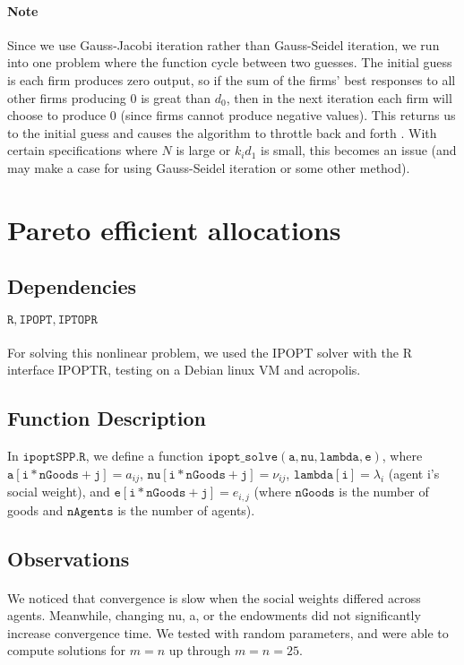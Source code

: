 \documentclass[11pt]{article}
\begin{document}
\paragraph{Note} Since we use Gauss-Jacobi iteration rather than Gauss-Seidel iteration, we run into one problem where the function cycle between two guesses. 
The initial guess is each firm produces zero output, so if the sum of the firms' best responses to all other firms producing 0 is great than $d_0$, then in the next iteration each firm will choose to produce 0 (since firms cannot produce negative values).
This returns us to the initial guess and causes the algorithm to throttle back and forth  . With certain specifications where $N$ is large or $k_i d_1$ is small, this becomes an issue (and may make a case for using Gauss-Seidel iteration or some other method).

\clearpage
\section{Pareto efficient allocations}
\subsection*{Dependencies} $\mathtt{R, IPOPT, IPTOPR}$
\paragraph{} For solving this nonlinear problem, we used the IPOPT solver with the R interface IPOPTR, testing on a Debian linux VM and acropolis.

\subsection*{Function Description}
In $\mathtt{ipoptSPP.R}$, we define a function $\mathtt{ipopt\_solve(a,nu,lambda,e)}$, where $\mathtt{a[i*nGoods + j]}= a_{ij}$, $\mathtt{nu[i*nGoods + j]}= \nu_{ij}$, $\mathtt{lambda[i]}=\lambda_i$ (agent i's social weight), and $\mathtt{e[i*nGoods + j]}=e_{i,j}$ (where $\mathtt{nGoods}$ is the number of goods and $\mathtt{nAgents}$ is the number of agents).

\subsection*{Observations}
\paragraph{} We noticed that convergence is slow when the social weights differed across agents. Meanwhile, changing nu, a, or the endowments did not significantly increase convergence time. We tested with random parameters, and were able to compute solutions for $m=n$ up through $m=n=25$.
\end{document}
